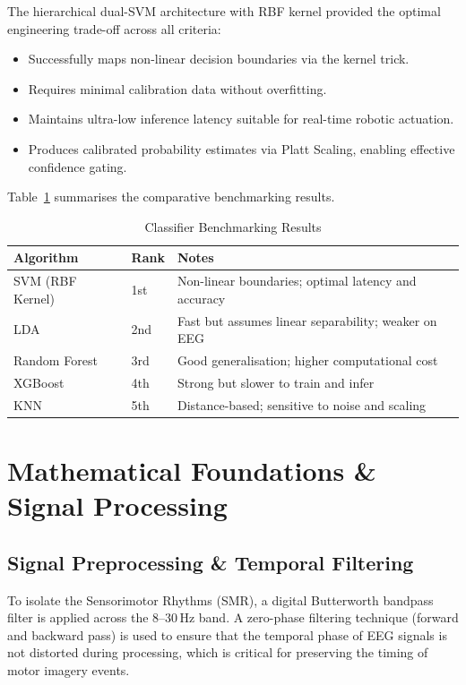 \documentclass[12pt, a4paper, oneside]{report}
\begin{document}
The hierarchical dual-SVM architecture with RBF kernel provided the optimal engineering
trade-off across all criteria:

\begin{itemize}
    \item Successfully maps non-linear decision boundaries via the kernel trick.
    \item Requires minimal calibration data without overfitting.
    \item Maintains ultra-low inference latency suitable for real-time robotic actuation.
    \item Produces calibrated probability estimates via Platt Scaling, enabling effective
          confidence gating.
\end{itemize}

Table~\ref{tab:benchmarking} summarises the comparative benchmarking results.

\begin{table}[h]
\centering
\caption{Classifier Benchmarking Results}
\label{tab:benchmarking}
\begin{tabular}{lll}
\toprule
\textbf{Algorithm} & \textbf{Rank} & \textbf{Notes} \\
\midrule
SVM (RBF Kernel)  & 1st & Non-linear boundaries; optimal latency and accuracy \\
LDA               & 2nd & Fast but assumes linear separability; weaker on EEG \\
Random Forest     & 3rd & Good generalisation; higher computational cost \\
XGBoost           & 4th & Strong but slower to train and infer \\
KNN               & 5th & Distance-based; sensitive to noise and scaling \\
\bottomrule
\end{tabular}
\end{table}

\section{Mathematical Foundations \& Signal Processing}

\subsection{Signal Preprocessing \& Temporal Filtering}

To isolate the Sensorimotor Rhythms (SMR), a digital Butterworth bandpass filter is
applied across the 8--30\,Hz band. A zero-phase filtering technique (forward and backward
pass) is used to ensure that the temporal phase of EEG signals is not distorted during
processing, which is critical for preserving the timing of motor imagery events.
\end{document}
